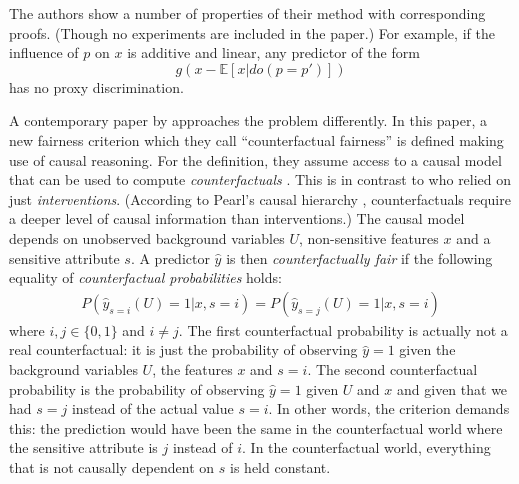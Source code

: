 The authors show a number of properties of their method with corresponding proofs.
(Though no experiments are included in the paper.)
For example, if the influence of \(p\) on \(x\) is additive and linear,
any predictor of the form \[g(x - \mathbb{E}[x|do(p=p')])\] has no proxy discrimination.


A contemporary paper by \citet{kusner2017counterfactual} approaches the problem differently.
In this paper, a new fairness criterion which they call ``counterfactual fairness''
is defined making use of causal reasoning.
For the definition, they assume access to a causal model
that can be used to compute \emph{counterfactuals} \citep[for example a structural equation model;][]{kaplan2008structural}.
This is in contrast to \citet{kilbertus2017avoiding} who relied on just \emph{interventions}.
(According to Pearl's causal hierarchy \citep{pearl2019seven},
counterfactuals require a deeper level of causal information than interventions.)
The causal model depends on unobserved background variables \(U\),
non-sensitive features \(x\) and a sensitive attribute \(s\).
A predictor \(\hat{y}\) is then \emph{counterfactually fair}
if the following equality of \emph{counterfactual probabilities} holds:
\begin{align}
  \label{eq:counterfactual-fairness}
  P(\hat{y}_{s=i}(U) = 1|x, s=i)=P(\hat{y}_{s=j}(U) = 1|x, s=i)
\end{align}
where \(i, j \in \{0, 1\}\) and \(i \neq j\).
The first counterfactual probability is actually not a real counterfactual:
it is just the probability of observing \(\hat{y} = 1\)
given the background variables \(U\), the features \(x\) and \(s=i\).
The second counterfactual probability is the probability of observing \(\hat{y} = 1\)
given \(U\) and \(x\) and given that we had \(s=j\) instead of the actual value \(s=i\).
In other words, the criterion demands this:
the prediction would have been the same in the counterfactual world
where the sensitive attribute is \(j\) instead of \(i\).
In the counterfactual world, everything that is not causally dependent on \(s\) is held constant.

